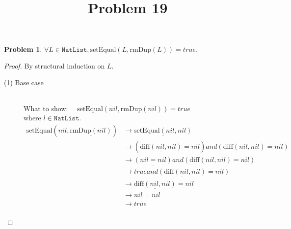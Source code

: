 \documentclass[12pt, a4paper]{article}
\title{Problem 19}
\date{\vspace{-5ex}}
\newtheorem{problem}{Problem}
\newcommand{\rel}[1]{\mathrel{#1}}
\newcommand{\rmx}[1]{\mathrm{#1}}
\newcommand{\larrow}{\longrightarrow}
\newcommand{\under}{\underline}
\begin{document}
\maketitle

\begin{problem}
$\forall L \in \mathtt{NatList}, \rmx{setEqual}(L, \rmx{rmDup}(L)) = true$.
\end{problem}
\begin{proof}
By structural induction on $L$.
\begin{description}
\item[(1) Base case]~\\
\noindent
What to show: $\quad \rmx{setEqual}(nil, \rmx{rmDup}(nil)) = true$\\
where $l \in \mathtt{NatList}$.
\begin{align*}
\rmx{setEqual}(nil, \under{\rmx{rmDup}(nil)})
	&\larrow \under{\rmx{setEqual}(nil, nil)} \tag{by rmDup1} \\
	&\larrow (\under{\rmx{diff}(nil, nil)} = nil) \rel{and} (\rmx{diff}(nil, nil) = nil) \tag{by setEq} \\
	&\larrow \under{(nil = nil)} \rel{and} (\rmx{diff}(nil, nil) = nil) \tag{by diff1} \\
	&\larrow \under{true \rel{and} (\rmx{diff}(nil, nil) = nil)} \tag{by equality} \\
	&\larrow \under{\rmx{diff}(nil, nil)} = nil \tag{by and} \\
	&\larrow \under{nil = nil} \tag{by diff1} \\
	&\larrow true \tag{by equality} \\	
\end{align*}


\end{description}
\end{proof}
\end{document}
